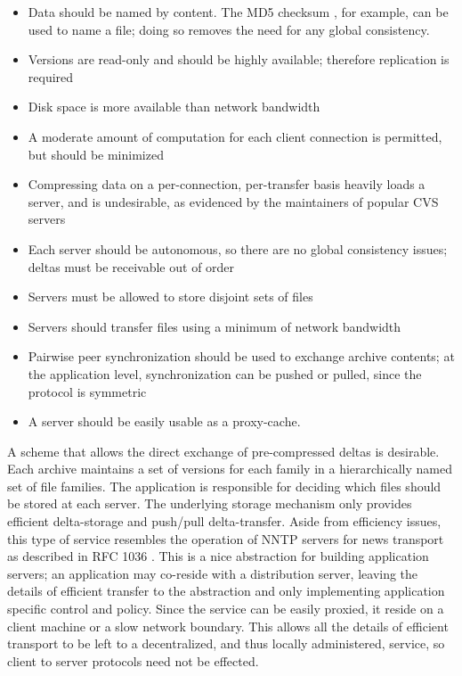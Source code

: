 \documentclass{llncs}
\begin{document}
\begin{itemize}
\item Data should be named by content.  The MD5 checksum
\cite{RFC1321}, for example, can be used to name a file; doing so
removes the need for any global consistency.
\item Versions are read-only and should be highly available; therefore
replication is required
\item Disk space is more available than network bandwidth
\item A moderate amount of computation for each client connection is
permitted, but should be minimized
\item Compressing data on a per-connection, per-transfer basis heavily
loads a server, and is undesirable, as evidenced by the maintainers of
popular CVS servers \cite{mozillaCvs}
\item Each server should be autonomous, so there are no global
consistency issues; deltas must be receivable out of order
\item Servers must be allowed to store disjoint sets of files
\item Servers should transfer files using a minimum of network
bandwidth
\item Pairwise peer synchronization should be used to exchange archive
contents; at the application level, synchronization can be pushed or
pulled, since the protocol is symmetric
\item A server should be easily usable as a proxy-cache.
\end{itemize}

\noindent A scheme that allows the direct exchange of pre-compressed
deltas is desirable.  Each archive maintains a set of versions for
each family in a hierarchically named set of file families.  The
application is responsible for deciding which files should be stored
at each server.  The underlying storage mechanism only provides
efficient delta-storage and push/pull delta-transfer.  Aside from
efficiency issues, this type of service resembles the operation of
NNTP servers for news transport as described in RFC 1036
\cite{RFC1036}.  This is a nice abstraction for building application
servers; an application may co-reside with a distribution server,
leaving the details of efficient transfer to the abstraction and only
implementing application specific control and policy.  Since the
service can be easily proxied, it reside on a client machine or a slow
network boundary.  This allows all the details of efficient transport
to be left to a decentralized, and thus locally administered, service,
so client to server protocols need not be effected.
\end{document}
